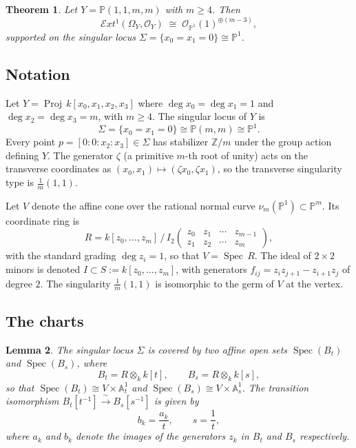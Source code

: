 \documentclass[11pt,twoside]{amsart}
\theoremstyle{plain}
\numberwithin{equation}{section}
\newtheorem{theorem}{Theorem}[section]
\newtheorem{lemma}[theorem]{Lemma}
\DeclareMathOperator{\Spec}{Spec}
\DeclareMathOperator{\Proj}{Proj}
\newcommand{\OO}{\mathcal{O}}
\newcommand{\PP}{\mathbb{P}}
\newcommand{\AAA}{\mathbb{A}}
\newcommand{\ZZ}{\mathbb{Z}}
\theoremstyle{definition}
\begin{document}
\begin{theorem}\label{thm:main}
Let $Y = \PP(1,1,m,m)$ with $m \geq 4$. Then
\[
\mathcal{E}xt^1(\Omega_Y, \OO_Y) \;\cong\; \OO_{\PP^1}(1)^{\oplus(m-3)},
\]
supported on the singular locus $\Sigma = \{x_0 = x_1 = 0\} \cong \PP^1$.
\end{theorem}
 
\subsection{Notation}
 
Let $Y = \Proj\, k[x_0, x_1, x_2, x_3]$ where $\deg x_0 = \deg x_1 = 1$ and $\deg x_2 = \deg x_3 = m$, with $m \geq 4$. The singular locus of $Y$ is
\[
\Sigma = \{x_0 = x_1 = 0\} \cong \PP(m,m) \cong \PP^1.
\]
Every point $p = [0:0:x_2:x_3] \in \Sigma$ has stabilizer $\ZZ/m$ under the group action defining $Y$. The generator $\zeta$ (a primitive $m$-th root of unity) acts on the transverse coordinates as $(x_0, x_1) \mapsto (\zeta x_0, \zeta x_1)$, so the transverse singularity type is $\frac{1}{m}(1,1)$.
 
Let $V$ denote the affine cone over the rational normal curve $\nu_m(\PP^1) \subset \PP^m$. Its coordinate ring is
\[
R = k[z_0, \ldots, z_m] \,\big/\, I_2\!\begin{pmatrix} z_0 & z_1 & \cdots & z_{m-1} \\ z_1 & z_2 & \cdots & z_m \end{pmatrix},
\]
with the standard grading $\deg z_i = 1$, so that $V = \Spec\, R$. The ideal of $2 \times 2$ minors is denoted $I \subset S := k[z_0, \ldots, z_m]$, with generators $f_{ij} = z_i z_{j+1} - z_{i+1} z_j$ of degree $2$. The singularity $\frac{1}{m}(1,1)$ is isomorphic to the germ of $V$ at the vertex.
 
\subsection{The charts}
 
\begin{lemma}\label{lem:charts}
The singular locus $\Sigma$ is covered by two affine open sets $\Spec(B_t)$ and $\Spec(B_s)$, where
\[
B_t = R \otimes_k k[t], \qquad B_s = R \otimes_k k[s],
\]
so that $\Spec(B_t) \cong V \times \AAA^1_t$ and $\Spec(B_s) \cong V \times \AAA^1_s$. The transition isomorphism $B_t[t^{-1}] \xrightarrow{\;\sim\;} B_s[s^{-1}]$ is given by
\begin{equation}\label{eq:transition_rings}
b_k = \frac{a_k}{t}, \qquad s = \frac{1}{t},
\end{equation}
where $a_k$ and $b_k$ denote the images of the generators $z_k$ in $B_t$ and $B_s$ respectively.
\end{lemma}
 
\end{document}
